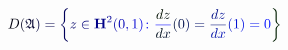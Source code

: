 \documentclass[12pt]{article}
\begin{document}
\makeatletter
\renewcommand*{\@textcolor}[3]{%
  \protect\leavevmode
  \begingroup
    \color#1{#2}#3%
  \endgroup
}
\makeatother
\begin{displaymath}
\displaystyle \mathcolor[RGB]{0,0,15}{D} \mathcolor[RGB]{0,0,30}{(} \mathfrak { \mathcolor[RGB]{0,0,45}{A} } \mathcolor[RGB]{0,0,60}{)} \mathcolor[RGB]{0,0,75}{=} \mathcolor[RGB]{0,0,90}{\left\{} \mathcolor[RGB]{0,0,105}{z} \mathcolor[RGB]{0,0,120}{\in} \mathbf { \mathcolor[RGB]{0,0,135}{H} } ^ { \mathcolor[RGB]{0,0,150}{2} } \mathcolor[RGB]{0,0,165}{(} \mathcolor[RGB]{0,0,180}{0} \mathcolor[RGB]{0,0,195}{,} \mathcolor[RGB]{0,0,210}{1} \mathcolor[RGB]{0,0,225}{)} \mathcolor[RGB]{0,0,240}{\colon} \mathcolor[RGB]{0,0,255}{\frac { \mathcolor[RGB]{0,15,0}{d} \mathcolor[RGB]{0,15,15}{z} } { \mathcolor[RGB]{0,15,30}{d} \mathcolor[RGB]{0,15,45}{x} } } \mathcolor[RGB]{0,15,60}{(} \mathcolor[RGB]{0,15,75}{0} \mathcolor[RGB]{0,15,90}{)} \mathcolor[RGB]{0,15,105}{=} \mathcolor[RGB]{0,15,120}{\frac { \mathcolor[RGB]{0,15,135}{d} \mathcolor[RGB]{0,15,150}{z} } { \mathcolor[RGB]{0,15,165}{d} \mathcolor[RGB]{0,15,180}{x} } } \mathcolor[RGB]{0,15,195}{(} \mathcolor[RGB]{0,15,210}{1} \mathcolor[RGB]{0,15,225}{)} \mathcolor[RGB]{0,15,240}{=} \mathcolor[RGB]{0,15,255}{0} \mathcolor[RGB]{0,30,0}{\right\}}
\end{displaymath}
\end{document}
